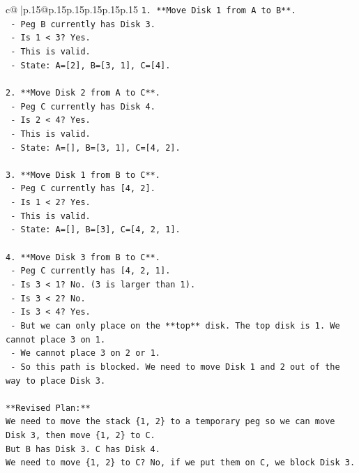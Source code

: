 \documentclass{article}
\begin{document}
{\begin{supertabular}{c@{$\;$}|p{.15\linewidth}@{}p{.15\linewidth}p{.15\linewidth}p{.15\linewidth}p{.15\linewidth}p{.15\linewidth}}
{{{\texttt{1. **Move Disk 1 from A to B**.} \\
\texttt{   {-} Peg B currently has Disk 3.} \\
\texttt{   {-} Is 1 < 3? Yes.} \\
\texttt{   {-} This is valid.} \\
\texttt{   {-} State: A={[}2{]}, B={[}3, 1{]}, C={[}4{]}.} \\
\\ 
\texttt{2. **Move Disk 2 from A to C**.} \\
\texttt{   {-} Peg C currently has Disk 4.} \\
\texttt{   {-} Is 2 < 4? Yes.} \\
\texttt{   {-} This is valid.} \\
\texttt{   {-} State: A={[}{]}, B={[}3, 1{]}, C={[}4, 2{]}.} \\
\\ 
\texttt{3. **Move Disk 1 from B to C**.} \\
\texttt{   {-} Peg C currently has {[}4, 2{]}.} \\
\texttt{   {-} Is 1 < 2? Yes.} \\
\texttt{   {-} This is valid.} \\
\texttt{   {-} State: A={[}{]}, B={[}3{]}, C={[}4, 2, 1{]}.} \\
\\ 
\texttt{4. **Move Disk 3 from B to C**.} \\
\texttt{   {-} Peg C currently has {[}4, 2, 1{]}.} \\
\texttt{   {-} Is 3 < 1? No. (3 is larger than 1).} \\
\texttt{   {-} Is 3 < 2? No.} \\
\texttt{   {-} Is 3 < 4? Yes.} \\
\texttt{   {-} But we can only place on the **top** disk. The top disk is 1. We cannot place 3 on 1.} \\
\texttt{   {-} We cannot place 3 on 2 or 1.} \\
\texttt{   {-} So this path is blocked. We need to move Disk 1 and 2 out of the way to place Disk 3.} \\
\\ 
\texttt{**Revised Plan:**} \\
\texttt{We need to move the stack \{1, 2\} to a temporary peg so we can move Disk 3, then move \{1, 2\} to C.} \\
\texttt{But B has Disk 3. C has Disk 4.} \\
\texttt{We need to move \{1, 2\} to C? No, if we put them on C, we block Disk 3.} \\
}}}
\end{supertabular}}
\end{document}
